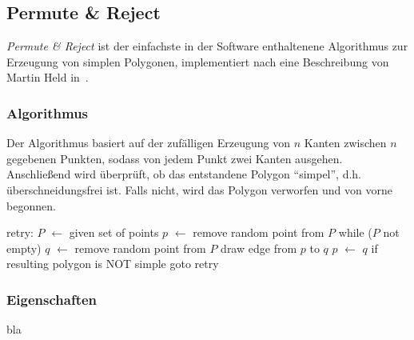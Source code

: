 \subsection{Permute \& Reject}
\emph{Permute \& Reject} ist der einfachste in der Software enthaltenene Algorithmus zur Erzeugung von simplen Polygonen, implementiert nach eine Beschreibung von Martin Held in~\cite{held98polygons}.
\subsubsection{Algorithmus}
Der Algorithmus basiert auf der zufälligen Erzeugung von $n$ Kanten zwischen $n$ gegebenen Punkten, sodass von jedem Punkt zwei Kanten ausgehen. Anschließend wird überprüft, ob das entstandene Polygon \enquote{simpel}, d.h. überschneidungsfrei ist. Falls nicht, wird das Polygon verworfen und von vorne begonnen.

\begin{code}[caption={Permute \& Reject},label=permutelisting,mathescape=true]
retry:
$P$ $\leftarrow$ given set of points
$p$ $\leftarrow$ remove random point from $P$
while ($P$ not empty)
  $q$ $\leftarrow$ remove random point from $P$
  draw edge from $p$ to $q$
  $p$ $\leftarrow$ $q$
if resulting polygon is NOT simple
  goto retry
\end{code}

\subsubsection{Eigenschaften}
bla